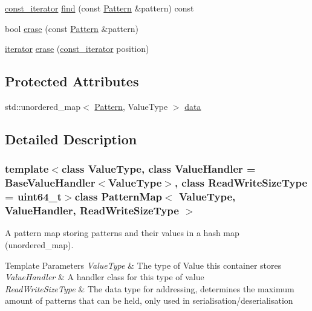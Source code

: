 \begin{DoxyCompactItemize}
\item 
\hyperlink{classPatternMap_aba8ff62eadadedc25bf4ea799a322cf3}{const\+\_\+iterator} \hyperlink{classPatternMap_a685d9bac878f2d8862c6c193ba9de45e}{find} (const \hyperlink{classPattern}{Pattern} \&pattern) const 
\item 
bool \hyperlink{classPatternMap_a96e5a77a5c782f340fe38f5c05ae30c4}{erase} (const \hyperlink{classPattern}{Pattern} \&pattern)
\item 
\hyperlink{classPatternMap_a4de5ceaff3526d091098b4d82dde2b27}{iterator} \hyperlink{classPatternMap_ac7bfe17942e5fb3c1bad7f975b61b650}{erase} (\hyperlink{classPatternMap_aba8ff62eadadedc25bf4ea799a322cf3}{const\+\_\+iterator} position)
\end{DoxyCompactItemize}
\subsection*{Protected Attributes}
\begin{DoxyCompactItemize}
\item 
std\+::unordered\+\_\+map$<$ \hyperlink{classPattern}{Pattern}, Value\+Type $>$ \hyperlink{classPatternMap_af7de0fc22bf41d3d2a7a04260b431cb7}{data}
\end{DoxyCompactItemize}


\subsection{Detailed Description}
\subsubsection*{template$<$class Value\+Type, class Value\+Handler = Base\+Value\+Handler$<$\+Value\+Type$>$, class Read\+Write\+Size\+Type = uint64\+\_\+t$>$class Pattern\+Map$<$ Value\+Type, Value\+Handler, Read\+Write\+Size\+Type $>$}

A pattern map storing patterns and their values in a hash map (unordered\+\_\+map). 


\begin{DoxyTemplParams}{Template Parameters}
{\em Value\+Type} & The type of Value this container stores \\
\hline
{\em Value\+Handler} & A handler class for this type of value \\
\hline
{\em Read\+Write\+Size\+Type} & The data type for addressing, determines the maximum amount of patterns that can be held, only used in serialisation/deserialisation \\
\hline
\end{DoxyTemplParams}


